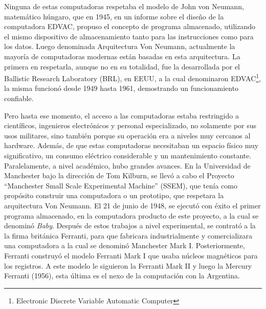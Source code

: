 \documentclass[%
 	final,
%
	notitlepage,
	narroweqnarray,
	inline,
 	twoside,
	]{ieee}
\begin{document}
Ninguna de estas computadoras respetaba el modelo de John von Neumann, matem\'atico h\'ungaro, que en 1945, en un informe sobre el dise\~no de la computadora EDVAC, propuso el concepto de programa almacenado, utilizando el mismo dispositivo de almacenamiento tanto para las instrucciones como para los datos. Luego denominada Arquitectura Von Neumann\cite{newman}, actualmente la mayor\'ia de computadoras modernas est\'an basadas en esta arquitectura.
La primera en respetarla, aunque no en su totalidad, fue la desarrollada por el Ballistic Research Laboratory (BRL), en EEUU, a la cual denominaron EDVAC\footnote{Electronic Discrete Variable Automatic Computer\cite{edvac}}, la misma funcion\'o desde 1949 hasta 1961, demostrando un funcionamiento confiable.

Pero hasta ese momento, el acceso a las computadoras estaba restringido a cient\'ificos, ingenieros electr\'onicos y personal especializado, no solamente por sus usos militares, sino tambi\'en porque su operaci\'on era a niveles muy cercanos al hardware. Adem\'as, de que estas computadoras necesitaban un espacio f\'isico muy significativo, un consumo el\'ectrico considerable y un mantenimiento constante.
Paralelamente, a nivel acad\'emico, hubo grandes avances. En la Universidad de Manchester bajo la direcci\'on de Tom Kilburn, se llev\'o a cabo el Proyecto “Manchester Small Scale Experimental Machine” (SSEM), que ten\'ia como prop\'osito construir una computadora o un prototipo, que respetara la arquitectura Von Neumann. El 21 de junio de 1948, se ejecut\'o con \'exito el primer programa almacenado, en la computadora producto de este proyecto, a la cual se denomin\'o \textit{Baby}.
Despu\'es de estos trabajos a nivel experimental, se contrat\'o a la la firma brit\'anica Ferranti\cite{ferranti}, para que fabricara industrialmente y comercializara una computadora a la cual se denomin\'o Manchester Mark I\cite{mark1}.
Posteriormente, Ferranti construy\'o el modelo Ferranti Mark I que usaba n\'ucleos magn\'eticos para los registros. A este modelo le siguieron la Ferranti Mark II y luego la Mercury Ferranti (1956), esta \'ultima es el nexo de la computaci\'on con la Argentina.
\end{document}

